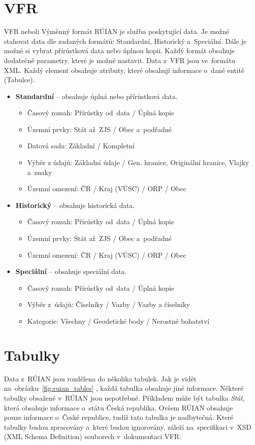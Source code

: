 \documentclass[czech, kiv, ba, he, iso690numb, pdf]{fasthesis}
\begin{document}
\section{VFR}
VFR neboli Výměnný formát RÚIAN je služba poskytující data.
Je možné stahovat data dle zadaných formátů: Standardní, Historický a~Speciální.
Dále je možné si vybrat přírůstková data nebo úplnou kopii.
Každý formát obsahuje dodatečně parametry, které je možné nastavit.
Data z~VFR jsou ve~formátu XML.
Každý element obsahuje atributy, které obsahují informace o~dané entitě (Tabulce).
\newpage
\begin {itemize}
    \item \textbf{Standardní} -- obsahuje úplná nebo přírůstková data.
    \begin {itemize}
        \item Časový rozsah: Přírůstky od~data / Úplná kopie
        \item Územní prvky: Stát až~ZJS / Obec a~podřadné
        \item Datová sada: Základní / Kompletní
        \item Výběr z údajů: Základní údaje / Gen. hranice, Originální hranice, Vlajky a~znaky
        \item Územní omezení: ČR / Kraj (VÚSC) / ORP / Obec
    \end {itemize}
    \item \textbf{Historický} -- obsahuje historická data.
    \begin {itemize}
        \item Časový rozsah: Přírůstky od~data / Úplná kopie
        \item Územní prvky: Stát až~ZJS / Obec a~podřadné
        \item Územní omezení: ČR / Kraj (VÚSC) / ORP / Obec
    \end {itemize}
    \item \textbf{Speciální} -- obsahuje speciální data.
    \begin {itemize}
        \item Časový rozsah: Přírůstky od~data / Úplná kopie
        \item Výběr z~údajů: Číselníky / Vazby / Vazby a číselníky
        \item Kategorie: Všechny / Geodetické body / Nerostné bohatství
    \end {itemize}
\end {itemize}

\section{Tabulky}
Data z~RÚIAN jsou rozdělena do několika tabulek.
Jak je vidět na~obrázku~\ref{fig:ruian_tables} \cite{ruian_vfr}, každá tabulka obsahuje jiné informace.
Některé tabulky obsažené v~RÚIAN jsou nepotřebné. 
Příkladem může být tabulka \textit{Stát}, která obsahuje informace o~státu Česká republika.
Ovšem RÚIAN obsahuje pouze informace o~České republice, tudíž tato tabulka je nadbytečná.
Které tabulky budou zpracovány a~které budou ignorovány, záleží na~specifikaci 
v~XSD (XML Schema Definition) souborech v~dokumentaci VFR. 
\newpage
\end{document}
